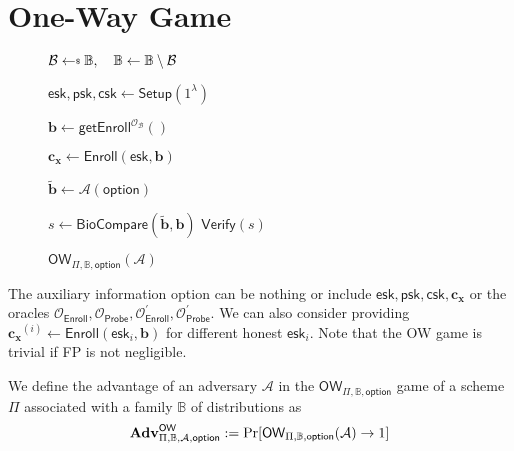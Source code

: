 
\newpage



\section{One-Way Game}

\begin{figure}[h]
\centering

	\begin{minipage}[t]{0.55\textwidth}
	\begin{algorithm}[H]
	\caption{$\textsf{OW}_{\Pi, \mathbb{B}, \textsf{option}}(\mathcal{A})$}
	\label{alg:ow_game}
	\begin{algorithmic}[1]

		\State $\mathcal{B} \getsdollar \mathbb{B}, \quad \mathbb{B} \gets \mathbb{B} \setminus \mathcal{B}$

		\State $\textsf{esk}, \textsf{psk}, \textsf{csk} \gets \textsf{Setup}(1^\lambda)$

		\State $\mathbf{b} \gets \textsf{getEnroll}^{\mathcal{O}_{\mathcal{B}}}()$

		\State $\mathbf{c_x} \gets \textsf{Enroll}(\textsf{esk}, \mathbf{b})$

		\State $\mathbf{\tilde{b}} \gets \mathcal{A}( \textsf{option} )$

		\State $s \gets \textsf{BioCompare}( \mathbf{\tilde{b}}, \mathbf{b})$
		\State \Return $ \textsf{Verify}(s) $
	\end{algorithmic}
	\end{algorithm}
	\end{minipage}

\label{fig:ow_game}
\end{figure}

The auxiliary information \textsf{option} can be nothing or include $\textsf{esk}, \textsf{psk}, \textsf{csk}, \mathbf{c_x}$ or the oracles $\mathcal{O}_{\textsf{Enroll}}, \mathcal{O}_{\textsf{Probe}}, \mathcal{O}^\prime_{\textsf{Enroll}}, \mathcal{O}^\prime_{\textsf{Probe}}$. We can also consider providing $\mathbf{c_x}^{(i)} \gets \textsf{Enroll}(\textsf{esk}_i, \mathbf{b})$ for different honest $\textsf{esk}_i$. Note that the \textsf{OW} game is trivial if \textsf{FP} is not negligible.

We define the advantage of an adversary $\mathcal{A}$ in the $\textsf{OW}_{\Pi, \mathbb{B}, \textsf{option}}$ game of a scheme $\Pi$ associated with a family $\mathbb{B}$ of distributions as
\[
	\mathbf{Adv}^{\textsf{OW}}_{\Pi, \mathbb{B}, \mathcal{A}, \textsf{option}} := \Pr[\textsf{OW}_{\Pi, \mathbb{B}, \textsf{option}}(\mathcal{A}) \to 1]
\]

